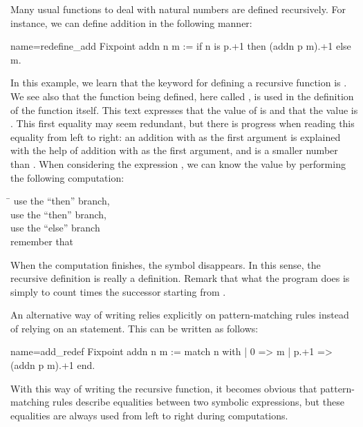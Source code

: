 Many usual functions to deal with natural numbers are
defined recursively.  For instance, we can define addition in the
following manner:

\begin{coq}{name=redefine_add}{}
Fixpoint addn n m :=
  if n is p.+1 then (addn p m).+1 else m.
\end{coq}
In this example, we learn that the keyword for defining a recursive
function is .  We see also that the function being
defined, here called , is used in the definition of the
function  itself.  This text expresses that the value of
 is
 and that the value  is .
This first equality may
seem redundant, but there is progress when reading this equality from
left to right: an addition with  as the first argument
is explained with the help of addition with  as the first
argument, and  is a smaller number than .  When considering the
expression , we can know the value by performing the following
computation:
\begin{tabbing}
\=\kill
{} \> use the ``then'' branch, \\
 \> use the ``then'' branch, \\
 \> use the ``else'' branch\\
\> remember that 
\end{tabbing}
When the computation finishes, the symbol  disappears.  In
this sense, the recursive definition is really a definition.  Remark that
what the  program does is simply to count  times the
successor starting from .

An alternative way of writing  relies explicitly on
pattern-matching rules instead of relying on an  statement.
This can be written as follows:

\begin{coq}{name=add_redef}{}
Fixpoint addn n m :=
  match n with
  | 0 => m
  | p.+1 => (addn p m).+1
  end.
\end{coq}
With this way of writing the recursive function, it becomes obvious that
pattern-matching rules describe equalities between two symbolic
expressions, but these equalities are always used from left to right during
computations.

